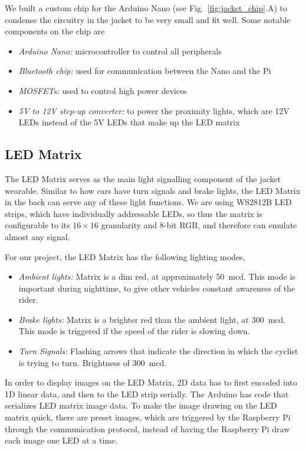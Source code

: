 \documentclass[journal]{IEEEtran}
\begin{document}
We built a custom chip for the Arduino Nano (see Fig.~\ref{fig:jacket_chip}.A) to condense the circuitry in the jacket to be very small and fit well. Some notable components on the chip are
\begin{itemize}
    \item \textit{Arduino Nano:} microcontroller to control all peripherals
    \item \textit{Bluetooth chip:} used for communication between the Nano and the Pi
    \item \textit{MOSFETs:} used to control high power devices 
    \item \textit{5V to 12V step-up converter:} to power the proximity lights, which are 12V LEDs instead of the 5V LEDs that make up the LED matrix
\end{itemize}

\subsection{LED Matrix}
The LED Matrix serves as the main light signalling component of the jacket wearable. Similar to how cars have turn signals and brake lights, the LED Matrix in the back can serve any of these light functions. We are using WS2812B LED strips, which have individually addressable LEDs, so thus the matrix is configurable to its $16 \times 16$ granularity and 8-bit RGB, and therefore can emulate almost any signal. 

For our project, the LED Matrix has the following lighting modes,
\begin{itemize}
    \item \textit{Ambient lights:} Matrix is a dim red, at approximately \SI{50}{\milli\candela}. This mode is important during nighttime, to give other vehicles constant awareness of the rider. 
    \item \textit{Brake lights:} Matrix is a brighter red than the ambient light, at \SI{300}{\milli\candela}. This mode is triggered if the speed of the rider is slowing down. 
    \item \textit{Turn Signals:} Flashing arrows that indicate the direction in which the cyclist is trying to turn. Brightness of \SI{300}{\milli\candela}.
\end{itemize}

In order to display images on the LED Matrix, 2D data has to first encoded into 1D linear data, and then to the LED strip serially. The Arduino has code that serializes LED matrix image data. To make the image drawing on the LED matrix quick, there are preset images, which are triggered by the Raspberry Pi through the communication protocol, instead of having the Raspberry Pi draw each image one LED at a time.
\end{document}
